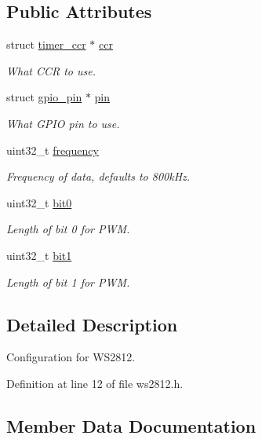 \subsection*{Public Attributes}
\begin{DoxyCompactItemize}
\item 
struct \hyperlink{structtimer__ccr}{timer\+\_\+ccr} $\ast$ \hyperlink{structws2812__config_a0c4b50ce11c055c0457af653c4951ee9}{ccr}
\begin{DoxyCompactList}\small\item\em What C\+C\+R to use. \end{DoxyCompactList}\item 
struct \hyperlink{structgpio__pin}{gpio\+\_\+pin} $\ast$ \hyperlink{structws2812__config_a665ce3190145f97af1d234f9de5defc1}{pin}
\begin{DoxyCompactList}\small\item\em What G\+P\+I\+O pin to use. \end{DoxyCompactList}\item 
uint32\+\_\+t \hyperlink{structws2812__config_a15634a419d7f20275ec1e6ba1215920b}{frequency}
\begin{DoxyCompactList}\small\item\em Frequency of data, defaults to 800k\+Hz. \end{DoxyCompactList}\item 
uint32\+\_\+t \hyperlink{structws2812__config_a22370b6dc4cdf5c6e25c4c155a275046}{bit0}
\begin{DoxyCompactList}\small\item\em Length of bit 0 for P\+W\+M. \end{DoxyCompactList}\item 
uint32\+\_\+t \hyperlink{structws2812__config_a410b277b06bbb4ff2f8fd8c6fb5bc994}{bit1}
\begin{DoxyCompactList}\small\item\em Length of bit 1 for P\+W\+M. \end{DoxyCompactList}\end{DoxyCompactItemize}


\subsection{Detailed Description}
Configuration for W\+S2812. 

Definition at line 12 of file ws2812.\+h.



\subsection{Member Data Documentation}
\hypertarget{structws2812__config_a22370b6dc4cdf5c6e25c4c155a275046}{}
